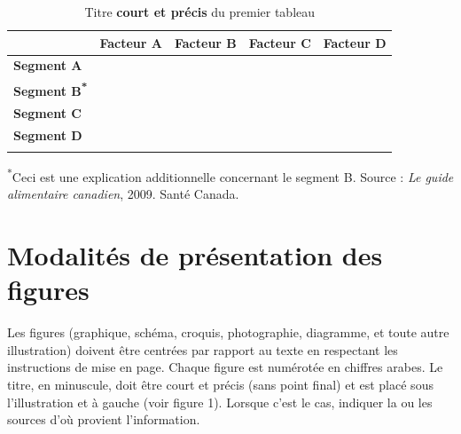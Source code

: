\begin{table}[h]
	\renewcommand{\arraystretch}{0.75}
	\caption{Titre \textbf{court et précis} du premier tableau}
	{\begin{tabularx}{\linewidth}{YYYYY} \toprule
	& \textbf{Facteur A} & \textbf{Facteur B} & \textbf{Facteur C} & \textbf{Facteur D} \\ \midrule
	\textbf{Segment A} & & & & \\ \addlinespace
	\textbf{Segment B\textsuperscript{*}} & & & & \\ \addlinespace
	\textbf{Segment C} & & & & \\ \addlinespace
	\textbf{Segment D} & & & & \\ \addlinespace
	\bottomrule
	\end{tabularx}}
	\newline \textsuperscript{*}Ceci est une explication additionnelle concernant le segment B.
	\newline Source : \textit{Le guide alimentaire canadien}, 2009. Santé Canada.
\end{table}

\section*{Modalités de présentation des figures}

Les figures (graphique, schéma, croquis, photographie, diagramme, et toute autre illustration) doivent être centrées par rapport au texte en respectant les instructions de mise en page. Chaque figure est numérotée en chiffres arabes. Le titre, en minuscule, doit être court et précis (sans point final) et est placé sous l'illustration et à gauche (voir figure 1). Lorsque c'est le cas, indiquer la ou les sources d'où provient l'information.

